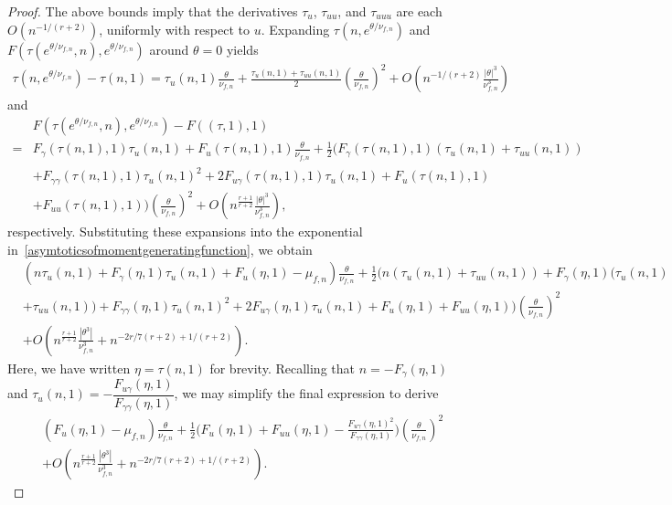 \documentclass[12pt, oneside,reqno]{amsart}
\numberwithin{equation}{section}
\begin{document}
\begin{proof}
\noindent
The above bounds imply that the derivatives $\tau_u$, $\tau_{uu}$, and $\tau_{uuu}$ are each $O(n^{-1/(r+2)})$, uniformly with respect to $u$. Expanding $\tau(n, e^{\theta/\nu_{f,n}})$ and $F(\tau(e^{\theta/\nu_{f,n}},n), e^{\theta/\nu_{f,n}})$ around $\theta=0$ yields
\begin{align*}
\tau(n,e^{\theta/\nu_{f,n}})-\tau(n,1)
=\tau_{u}(n,1)\frac{\theta}{\nu_{f,n}}+\frac{\tau_{u}(n,1)+\tau_{uu}(n,1)}{2}\left(\frac{\theta}{\nu_{f,n}}\right)^2+O\left(n^{-1/(r+2)}\frac{|\theta|^3}{\nu^3_{f,n}}\right)
\end{align*}
and
\begin{align*}
&F(\tau(e^{\theta/\nu_{f,n}},n), e^{\theta/\nu_{f,n}})-F((\tau,1),1)\\
=&F_{\gamma}(\tau(n,1),1)\tau_{u}(n,1)+F_{u}(\tau(n,1),1)\frac{\theta}{\nu_{f,n}}
+\frac{1}{2}\bigg(F_{\gamma}(\tau(n,1),1)(\tau_{u}(n,1)+\tau_{uu}(n,1))\\
&+F_{\gamma\gamma}(\tau(n,1),1)\tau_{u}(n,1)^2+2F_{u\gamma}(\tau(n,1),1)\tau_{u}(n,1)+F_{u}(\tau(n,1),1)\\
&+F_{uu}(\tau(n,1),1)\bigg)\left(\frac{\theta}{\nu_{f,n}}\right)^2+O\left(n^{\frac{r+1}{r+2}}\frac{|\theta|^3}{\nu^3_{f,n}}\right),
\end{align*}
respectively. Substituting these expansions into the exponential in~\eqref{asymtoticsofmomentgeneratingfunction}, we obtain
\begin{align*}
&\left(n\tau_u(n,1)+F_{\gamma}(\eta,1)\tau_u(n,1)+F_u(\eta,1)-\mu_{f,n}\right)\frac{\theta}{\nu_{f,n}}+\frac{1}{2}\bigg(n(\tau_u(n,1)+\tau_{uu}(n,1))+F_{\gamma}(\eta,1)(\tau_u(n,1)\\
&+\tau_{uu}(n,1))
+F_{\gamma\gamma}(\eta,1)\tau_u(n,1)^2+2F_{u\gamma}(\eta,1)\tau_u(n,1)+F_{u}(\eta,1)+F_{uu}(\eta,1)\bigg)\left(\frac{\theta}{\nu_{f,n}}\right)^2\\
&+O\left(n^{\frac{r+1}{r+2}}\frac{|\theta^3|}{\nu^3_{f,n}}+n^{-2r/7(r+2)+1/(r+2)}\right).
\end{align*}
Here, we have written $\eta = \tau(n, 1)$ for brevity. Recalling that $n = -F_{\gamma}(\eta, 1)$ and $\tau_u(n, 1) = -\dfrac{F_{u\gamma}(\eta, 1)}{F_{\gamma\gamma}(\eta, 1)}$, we may simplify the final expression to derive
\begin{align*}
&(F_{u}(\eta,1)-\mu_{f,n})\frac{\theta}{\nu_{f,n}}+\frac{1}{2}\bigg(F_{u}(\eta,1)+F_{uu}(\eta,1)-\frac{F_{u\gamma}(\eta,1)^2}{F_{\gamma\gamma}(\eta,1)}\bigg)\left(\frac{\theta}{\nu_{f,n}}\right)^2\\
&+O\left(n^{\frac{r+1}{r+2}}\frac{|\theta^3|}{\nu^3_{f,n}}+n^{-2r/7(r+2)+1/(r+2)}\right).
\end{align*}


\end{proof}
\end{document}
